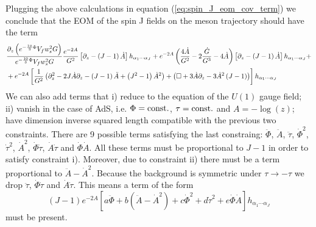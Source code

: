 \documentclass[a4paper,12pt]{article}
\begin{document}
Plugging the above calculations in equation (\ref{eq:spin_J_eom_cov_term}) we conclude that the EOM of the spin J fields on the meson trajectory should have the term
\begin{align}
&\frac{\partial_z \left(e^{-\frac{10}{3}\Phi} V_f w_s^2 G\right)}{e^{-\frac{10}{3}\Phi} V_f w_s^2 G} \frac{e^{-2A}}{G^2} \left[\partial_z - \left(J-1\right) \dot{A} \right]h_{\alpha_1 \cdots \alpha_J} + e^{-2A}\left( \frac{4 \dot{A}}{G^2} - 2 \frac{\dot{G}}{G^3} - 4 \dot{A} \right) \left[\partial_z - \left(J-1\right) \dot{A} \right]h_{\alpha_1  \cdots \alpha_J} + \notag \\
&+e^{-2A} \left[\frac{1}{G^2}\left(\partial_z^2 - 2 J \dot{A} \partial_z - \left(J-1\right) \ddot{A} + \left(J^2-1\right) {\dot{A}}^2 \right)+ \left( \Box + 3\dot{A} \partial_z - 3 {\dot{A}}^2 \left(J-1\right) \right)  \right]h_{\alpha_1 \cdots \alpha_J}
\end{align}
We can also add terms that i) reduce to the equation of the $U\left(1\right)$ gauge field; ii) vanish in the case of AdS, i.e. $\Phi = \rm{const.}$, $\tau = \rm{const.}$ and $A =  - \log(z)$; have dimension inverse squared length compatible with the previous two constraints. There are 9 possible terms satisfying the last constraing: $\ddot{\Phi}$, $\ddot{A}$, $\ddot{\tau}$, ${\dot{\Phi}}^2$, ${\dot{\tau}}^2$, ${\dot{A}}^2$, $\dot{\Phi} \dot{\tau}$, $\dot{A}\dot{\tau}$ and $\dot{\Phi}\dot{A}$. All these terms must be proportional to $J-1$ in order to satisfy constraint i). Moreover, due to constraint ii) there must be a term proportional to $\ddot{A} - \dot{A}^2$. Because the background is symmetric under $\tau \rightarrow -\tau$ we drop $\ddot{\tau}$, $\dot{\Phi}\dot{\tau}$ and $\dot{A}\dot{\tau}$. This means a term of the form
\begin{equation}
\left(J-1\right) e^{-2A} \left[ a \ddot{\Phi} + b \left(\ddot{A} - {\dot{A}}^2\right) + c {\dot{\Phi}}^2 + d {\dot{\tau}}^2 + e \dot{\Phi} \dot{A} \right] h_{\alpha_1 \cdots \alpha_J}
\end{equation}
must be present.
\end{document}
